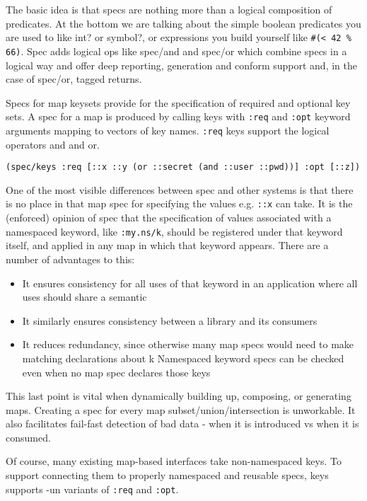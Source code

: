 The basic idea is that specs are nothing more than a logical composition of
predicates. At the bottom we are talking about the simple boolean predicates you
are used to like int? or symbol?, or expressions you build yourself like \texttt{\#(<
42 \% 66)}. Spec adds logical ops like spec/and and spec/or which combine specs
in a logical way and offer deep reporting, generation and conform support and,
in the case of spec/or, tagged returns.

Specs for map keysets provide for the specification of required and optional key
sets. A spec for a map is produced by calling keys with \texttt{:req} and
\texttt{:opt} keyword arguments mapping to vectors of key names. \texttt{:req}
keys support the logical operators and and or.

\begin{verbatim}
(spec/keys :req [::x ::y (or ::secret (and ::user ::pwd))] :opt [::z])
\end{verbatim}

One of the most visible differences between spec and other systems is that there
is no place in that map spec for specifying the values e.g. \texttt{::x} can
take. It is the (enforced) opinion of spec that the specification of values
associated with a namespaced keyword, like \texttt{:my.ns/k}, should be
registered under that keyword itself, and applied in any map in which that
keyword appears. There are a number of advantages to this:

\begin{itemize}
\item It ensures consistency for all uses of that keyword in an application where all
  uses should share a semantic

\item It similarly ensures consistency between a library
  and its consumers

\item It reduces redundancy, since otherwise many map specs would need to make
  matching declarations about k Namespaced keyword specs can be checked even
  when no map spec declares those keys

\end{itemize}

This last point is vital when dynamically building up, composing, or generating
maps. Creating a spec for every map subset/union/intersection is unworkable. It
also facilitates fail-fast detection of bad data - when it is introduced vs when
it is consumed.

Of course, many existing map-based interfaces take non-namespaced keys. To
support connecting them to properly namespaced and reusable specs, keys supports
-un variants of \texttt{:req} and \texttt{:opt}.

